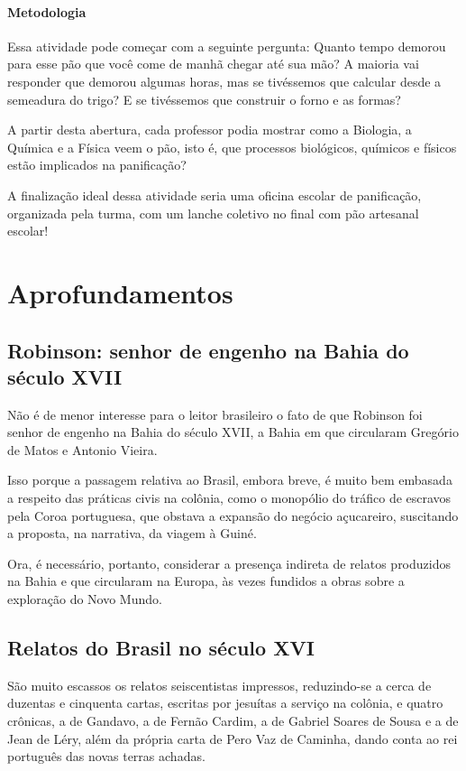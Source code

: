 \documentclass[12pt]{extarticle}
\begin{document}
\paragraph{Metodologia}
Essa atividade pode começar com a seguinte pergunta: Quanto tempo
demorou para esse pão que você come de manhã chegar até sua mão? A
maioria vai responder que demorou algumas horas, mas se tivéssemos que
calcular desde a semeadura do trigo? E se tivéssemos que construir o
forno e as formas?

A partir desta abertura, cada professor podia mostrar como a Biologia, a
Química e a Física veem o pão, isto é, que processos biológicos,
químicos e físicos estão implicados na panificação?

A finalização ideal dessa atividade seria uma oficina escolar de
panificação, organizada pela turma, com um lanche coletivo no final com
pão artesanal escolar!

\section{Aprofundamentos}

\subsection{Robinson: senhor de engenho na Bahia do século XVII}

Não é de menor interesse para o leitor brasileiro o fato de que Robinson
foi senhor de engenho na Bahia do século XVII, a Bahia em que circularam
Gregório de Matos e Antonio Vieira.

Isso porque a passagem relativa ao Brasil, embora breve, é muito bem
embasada a respeito das práticas civis na colônia, como o monopólio do
tráfico de escravos pela Coroa portuguesa, que obstava a expansão do
negócio açucareiro, suscitando a proposta, na narrativa, da viagem à
Guiné.

Ora, é necessário, portanto, considerar a presença indireta de relatos
produzidos na Bahia e que circularam na Europa, às vezes fundidos a
obras sobre a exploração do Novo Mundo.

\subsection{Relatos do Brasil no século XVI}

São muito escassos os relatos seiscentistas impressos, reduzindo-se a
cerca de duzentas e cinquenta cartas, escritas por jesuítas a serviço na
colônia, e quatro crônicas, a de Gandavo, a de Fernão Cardim, a de
Gabriel Soares de Sousa e a de Jean de Léry, além da própria carta de
Pero Vaz de Caminha, dando conta ao rei português das novas terras
achadas.
\end{document}
